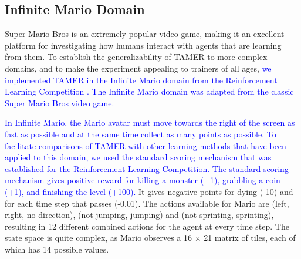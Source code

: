 

\subsection{Infinite Mario Domain}
\label{sec:domain}

Super Mario Bros is an extremely popular video game, %
making it an excellent platform for investigating how humans interact with agents that are learning from them. %
To establish the generalizability of TAMER to more complex domains, and to make the experiment appealing to trainers of all ages, \textcolor{blue}{we implemented TAMER in the Infinite Mario domain from the Reinforcement Learning Competition \cite{whiteson2010reinforcement,dimitrakakis2014reinforcement}. The Infinite Mario domain was adapted from the classic Super Mario Bros video game.} %

\textcolor{blue}{In Infinite Mario, the Mario avatar must move towards the right of the screen as fast as possible %
and at the same time collect as many points as possible. To facilitate comparisons of TAMER with other learning methods that have been applied to this domain, we used the standard scoring mechanism that was established for the Reinforcement Learning Competition. The standard scoring mechanism gives positive reward for killing a monster (+1), grabbling a coin (+1), and finishing the level (+100).} It gives negative points for dying (-10) and for each time step that passes (-0.01). The actions available for Mario %
are (left, right, no direction), (not jumping, jumping) and (not sprinting, sprinting), resulting in 12 different combined actions for the agent at every time step. The state space is quite complex, as Mario observes a 16 $\times$ 21 matrix of tiles, each of which has 14 possible values. 


